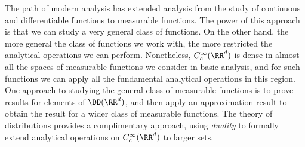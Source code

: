 The path of modern analysis has extended analysis from the study of continuous and differentiable functions to measurable functions. The power of this approach is that we can study a very general class of functions. On the other hand, the more general the class of functions we work with, the more restricted the analytical operations we can perform. Nonetheless, $C^\infty_c(\RR^d)$ is dense in almost all the spaces of measurable functions we consider in basic analysis, and for such functions we can apply all the fundamental analytical operations in this region. One approach to studying the general class of measurable functions is to prove results for elements of $\DD(\RR^d)$, and then apply an approximation result to obtain the result for a wider class of measurable functions. The theory of distributions provides a complimentary approach, using \emph{duality} to formally extend analytical operations on $C^\infty_c(\RR^d)$ to larger sets.

